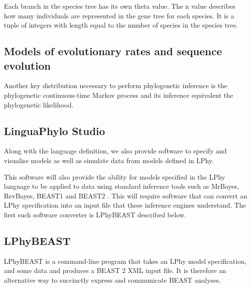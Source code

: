 \documentclass[11pt]{article}
\begin{document}
Each branch in the species tree has its own theta value. The n value describes how many individuals are represented in
the gene tree for each species. It is a tuple of integers with length equal to the number of species in the species
tree.

\subsection{Models of evolutionary rates and sequence evolution}

Another key distribution necessary to perform phylogenetic inference is the phylogenetic continuous-time Markov process and its inference equivalent the phylogenetic likelihood. 


\subsection{LinguaPhylo Studio}

Along with the language definition, we also provide software to specify and visualise models as well as simulate data from models defined in LPhy. 

This software will also provide the ability for models specified in the LPhy language to be applied to data using standard inference tools such as MrBayes, RevBayes, BEAST1 and BEAST2 \cite{bouckaert2014beastanalysis,DrummondBouckaert2015,bouckaert2019beastanalysis} . This will require software that can convert an LPhy specification into an input file that these inference engines understand. The first such software converter is LPhyBEAST described below.

\subsection{LPhyBEAST}

LPhyBEAST is a command-line program that takes an LPhy model specification, and some data and produces a BEAST 2 XML input file.
It is therefore an alternative way to succinctly express and communicate BEAST analyses.



\end{document}
